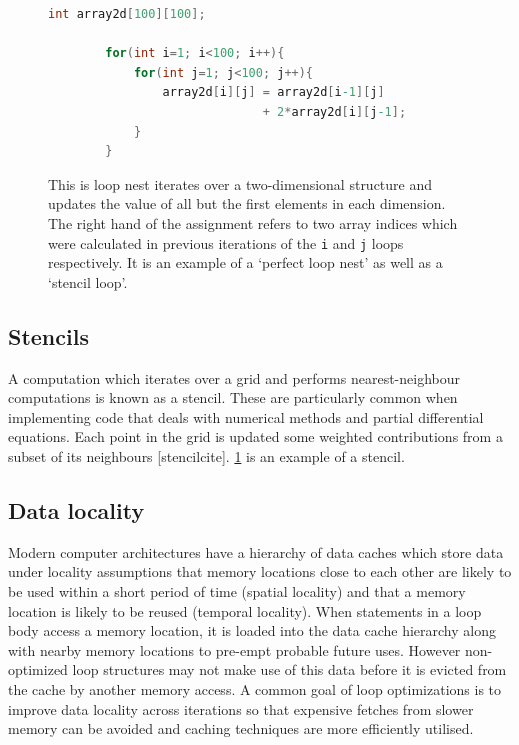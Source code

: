 \documentclass[a4paper,12pt,twoside]{report}
\begin{document}
\begin{figure}[h]
    \begin{lstlisting}[language=C]
        int array2d[100][100];

        for(int i=1; i<100; i++){
            for(int j=1; j<100; j++){
                array2d[i][j] = array2d[i-1][j] 
                              + 2*array2d[i][j-1];
            }
        }
    \end{lstlisting}
    \caption{
        This is loop nest iterates over a two-dimensional structure and updates the value of all but the first elements in each dimension.
        The right hand of the assignment refers to two array indices which were calculated in previous iterations of the \texttt{i} and \texttt{j} loops
        respectively. It is an example of a `perfect loop nest' as well as a `stencil loop'.
    }
    \label{fig:stencil}
\end{figure}

\subsection{Stencils}
A computation which iterates over a grid and performs nearest-neighbour computations is known as a stencil. These are
particularly common when implementing code that deals with numerical methods and partial differential equations.
Each point in the grid is updated some weighted contributions from a subset of its neighbours [stencilcite]. \ref{fig:stencil} is an example of a stencil.

\subsection{Data locality}
Modern computer architectures have a hierarchy of data caches which store data under locality assumptions that memory locations close to each other
are likely to be used within a short period of time (spatial locality) and that a memory location is likely to be reused (temporal locality). 
When statements in a loop body access a memory location, it is loaded into the data cache hierarchy along with nearby memory locations to pre-empt probable future uses.
However non-optimized loop structures may not make use of this data before it is evicted from the cache by another memory access.
A common goal of loop optimizations is to improve data locality across iterations so that expensive fetches from slower memory can be avoided 
and caching techniques are more efficiently utilised.
\end{document}
